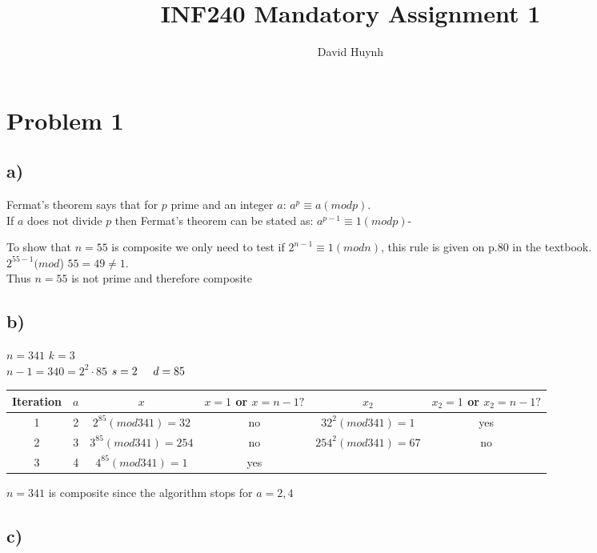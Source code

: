 \documentclass{article}
\begin{document}
\title{INF240 Mandatory Assignment 1}
\author{David Huynh}

\maketitle

\section*{Problem 1}

\subsection*{a)}
Fermat's theorem says that for $p$ prime and an integer $a$: $a^{p} \equiv a (mod p)$.\\
If $a$ does not divide $p$ then Fermat's theorem can be stated as: $a^{p-1} \equiv 1 (mod p)$-

To show that $n=55$ is composite we only need to test if $2^{n-1}
\equiv 1 (modn)$, this rule is given on p.80 in the textbook.\\
$2^{55-1} (mod$) $55 = 49 \neq 1$.\\
Thus $n=55$ is not prime and therefore composite

\subsection*{b)}

$n=341$ \hspace{5 mm} $k=3$\\
$n-1=340= 2^{2} \cdotp 85$ \hspace{5 mm} $s=2 \hspace{5mm} d=85$

\begin{tabular}{c | c | c | c | c | c}
Iteration & $a$ & $x$ & $x=1$ or $x=n-1?$ & $x_{2}$ & $x_{2}=1$ or $x_{2}=n-1?$\\ \hline

1 & 2 & $2^{85} (mod 341) = 32$ & no & $32^{2} (mod 341) = 1$ & yes\\
2 & 3 & $3^{85} (mod 341) = 254$ & no & $254^{2} (mod 341) = 67$ & no\\
3 & 4 & $4^{85} (mod 341) = 1$ & yes &  &
\end{tabular}

$n=341$ is composite since the algorithm stops for $a=2,4$

\subsection*{c)}
\end{document}
